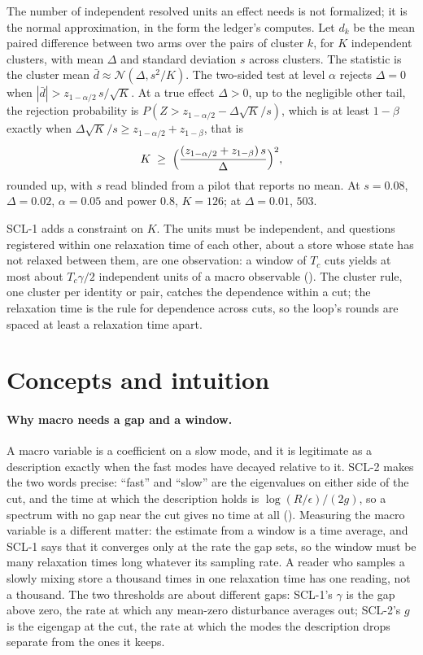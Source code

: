 \documentclass[11pt,a4paper]{article}
\theoremstyle{plain}
\theoremstyle{definition}
\theoremstyle{remark}
\newcommand{\abs}[1]{\left\lvert #1 \right\rvert}
\newcommand{\lean}[1]{\path{#1}}
\begin{document}
The number of independent resolved units an effect needs is not formalized; it is the normal
approximation, in the form the ledger's \lean{required\_clusters} computes. Let $d_k$ be the mean
paired difference between two arms over the pairs of cluster $k$, for $K$ independent clusters,
with mean $\Delta$ and standard deviation $s$ across clusters. The statistic is the cluster mean
$\bar d \approx \mathcal N(\Delta, s^2/K)$. The two-sided test at level $\alpha$ rejects $\Delta = 0$
when $\abs{\bar d} > z_{1-\alpha/2}\,s/\sqrt K$. At a true effect $\Delta > 0$, up to the negligible
other tail, the rejection probability is $P(Z > z_{1-\alpha/2} - \Delta\sqrt K/s)$, which is at least
$1 - \beta$ exactly when $\Delta\sqrt K/s \ge z_{1-\alpha/2} + z_{1-\beta}$, that is
\begin{equation}\label{eq:power}
  K \;\ge\; \Bigl(\frac{(z_{1-\alpha/2} + z_{1-\beta})\,s}{\Delta}\Bigr)^2,
\end{equation}
rounded up, with $s$ read blinded from a pilot that reports no mean. At $s = 0.08$, $\Delta = 0.02$,
$\alpha = 0.05$ and power $0.8$, $K = 126$; at $\Delta = 0.01$, $503$.

SCL-1 adds a constraint on $K$. The units must be independent, and questions registered within one
relaxation time of each other, about a store whose state has not relaxed between them, are one
observation: a window of $T_c$ cuts yields at most about $T_c\gamma/2$ independent units of a macro
observable (). The cluster rule, one cluster per identity or pair, catches the
dependence within a cut; the relaxation time is the rule for dependence across cuts, so the loop's
rounds are spaced at least a relaxation time apart.

\section{Concepts and intuition}

\paragraph{Why macro needs a gap and a window.}
A macro variable is a coefficient on a slow mode, and it is legitimate as a description exactly
when the fast modes have decayed relative to it. SCL-2 makes the two words precise: ``fast'' and
``slow'' are the eigenvalues on either side of the cut, and the time at which the description holds
is $\log(R/\epsilon)/(2g)$, so a spectrum with no gap near the cut gives no time at all
(). Measuring the macro variable is a different matter: the estimate from a
window is a time average, and SCL-1 says that it converges only at the rate the gap sets, so the
window must be many relaxation times long whatever its sampling rate. A reader who samples a slowly
mixing store a thousand times in one relaxation time has one reading, not a thousand. The two
thresholds are about different gaps: SCL-1's $\gamma$ is the gap above zero, the rate at which any
mean-zero disturbance averages out; SCL-2's $g$ is the eigengap at the cut, the rate at which the
modes the description drops separate from the ones it keeps.
\end{document}
